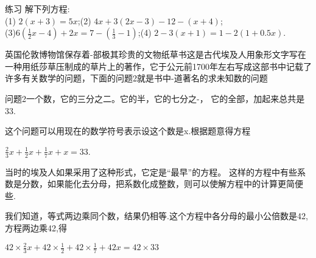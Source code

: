 \documentclass{article}
\begin{document}
\begin{article}
\begin{exercise}
练习
解下列方程:\\
(1) $2(x+3)=5x$;\indent\indent(2) $4x+3(2x- 3)-12- (x+4)$;\\
(3)$6\left( \frac{1}{2}x-4 \right)+2x=7-\left( \frac{1}{3}-1 \right)$;\indent\indent(4) $2- 3(x+1)=1-2(1+0.5x)$.
\end{exercise}

英国伦敦博物馆保存着-部极其珍贵的文物纸草书这是古代埃及人用象形文字写在一种用纸莎草压制成的草片上的著作，它于公元前1700年左右写成这部书中记载了许多有关数学的问题，下面的问题2就是书中-道著名的求未知数的问题

\begin{example}
问题2一个数，它的三分之二。它的半，它的七分之-， 它的全部，加起来总共是33.

这个问题可以用现在的数学符号表示设这个数是x.根据题意得方程

$\frac{2}{3}x+\frac{1}{2}x+\frac{1}{7}x+x=33$.

当时的埃及人如果采用了这种形式，它定是“最早”的方程。
这样的方程中有些系数是分数，如果能化去分母，把系数化成整数，则可以使解方程中的计算更简便些.

我们知道，等式两边乘同个数，结果仍相等.这个方程中各分母的最小公倍数是42,方程两边乘42,得

$42\times\frac{2}{3}x+42\times\frac{1}{2}+42\times\frac{1}{7}+42x=42\times33$

\end{example}

\end{article}
\end{document}
